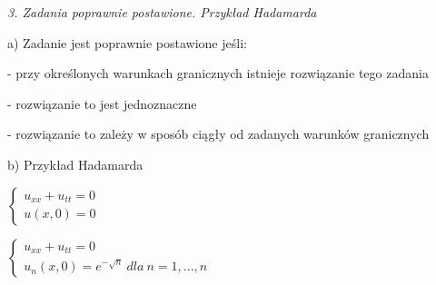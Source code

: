 \textit{3. Zadania poprawnie postawione. Przykład Hadamarda}

a) Zadanie jest poprawnie postawione jeśli:

  - przy określonych warunkach granicznych istnieje rozwiązanie tego zadania
  
  - rozwiązanie to jest jednoznaczne

  - rozwiązanie to zależy w sposób ciągły od zadanych warunków granicznych

b) Przykład Hadamarda

$\left\{\begin{matrix} u_{xx} + u_{tt} = 0 \\ u(x,0) = 0 \end{matrix}\right.$

$\left\{\begin{matrix} u_{xx} + u_{tt} = 0 \\ u_n(x,0) = e^{-\sqrt{n}}\ dla\ n = 1, ..., n \end{matrix}\right.$
